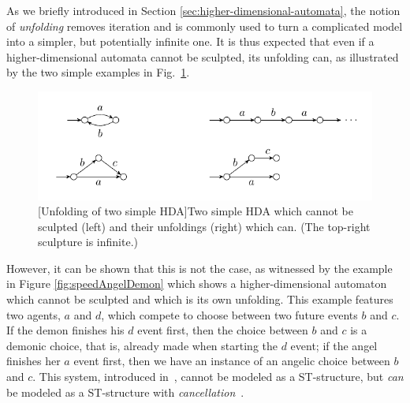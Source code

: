     As we briefly introduced in Section \ref{sec:higher-dimensional-automata}, the notion of \emph{unfolding} 
    removes iteration and is commonly used to turn a complicated model into a simpler, but potentially infinite one.
    It is thus expected that even if a higher-dimensional automata cannot be sculpted, its unfolding can, as illustrated by the two simple examples in Fig.~\ref{fig:unfoldings}.
    
    \begin{figure}[tbp]
        \centering
        \includegraphics[scale=1.2]{Figures/6.Conclusion/unfolding.pdf}
        [Unfolding of two simple HDA]{Two simple HDA which cannot be sculpted (left) and their unfoldings (right) which can.  (The top-right sculpture is infinite.)}
        \label{fig:unfoldings}
    \end{figure}
    
    However, it can be shown that this is not the case, as witnessed by the example in Figure \ref{fig:speedAngelDemon}  which shows a higher-dimensional automaton which cannot be sculpted and which is its own unfolding. This example features two agents, $a$ and $d$, which compete to choose between two future events $b$ and $c$.  If the demon finishes his $d$ event first, then 
    the choice between $b$ and $c$ is a demonic choice, that is, already made when starting the $d$ event;  if the angel finishes her $a$ event first, then 
    we have an instance of an angelic choice between $b$ and $c$. This system, introduced in~\cite{Johansen16STstruct}, cannot be modeled as a ST-structure, but \emph{can} be modeled as a ST-structure with \emph{cancellation}~\cite[Section~5]{Johansen16STstruct}.
    
